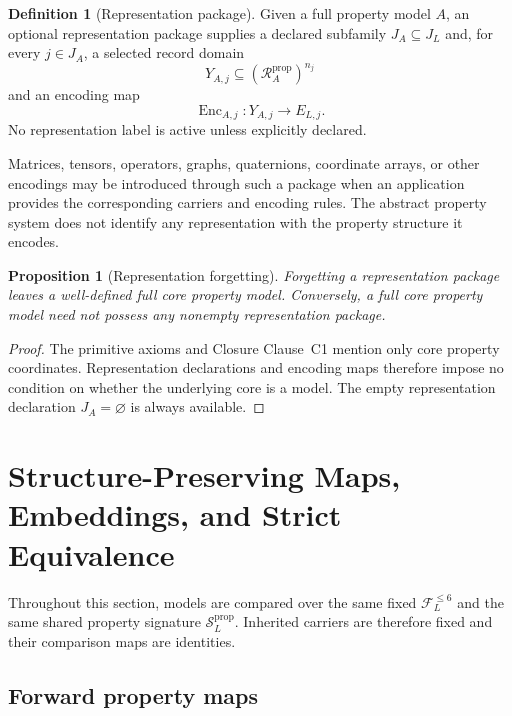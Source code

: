 \documentclass[11pt]{article}
\newcommand{\FVI}{\mathcal F_{L}^{\le 6}}
\newcommand{\Sprop}{\mathcal S_{L}^{\mathrm{prop}}}
\newcommand{\PropRec}{\mathcal R^{\mathrm{prop}}}
\newcommand{\Enc}{\operatorname{Enc}}
\newtheorem{proposition}[theorem]{Proposition}
\theoremstyle{definition}
\newtheorem{definition}[theorem]{Definition}
\theoremstyle{remark}
\begin{document}
\begin{definition}[Representation package]
Given a full property model \(A\), an optional representation package supplies a declared subfamily \(J_A\subseteq J_L\) and, for every \(j\in J_A\), a selected record domain
\[
Y_{A,j}\subseteq(\PropRec_A)^{n_j}
\]
and an encoding map
\[
\Enc_{A,j}:Y_{A,j}\longrightarrow E_{L,j}.
\]
No representation label is active unless explicitly declared.
\end{definition}

Matrices, tensors, operators, graphs, quaternions, coordinate arrays, or other encodings may be introduced through such a package when an application provides the corresponding carriers and encoding rules.
The abstract property system does not identify any representation with the property structure it encodes.

\begin{proposition}[Representation forgetting]
Forgetting a representation package leaves a well-defined full core property model.
Conversely, a full core property model need not possess any nonempty representation package.
\end{proposition}

\begin{proof}
The primitive axioms and Closure Clause~C1 mention only core property coordinates.
Representation declarations and encoding maps therefore impose no condition on whether the underlying core is a model.
The empty representation declaration \(J_A=\varnothing\) is always available.
\end{proof}

\section{Structure-Preserving Maps, Embeddings, and Strict Equivalence}
\label{sec:maps}

Throughout this section, models are compared over the same fixed \(\FVI\) and the same shared property signature \(\Sprop\).
Inherited carriers are therefore fixed and their comparison maps are identities.

\subsection{Forward property maps}
\end{document}
